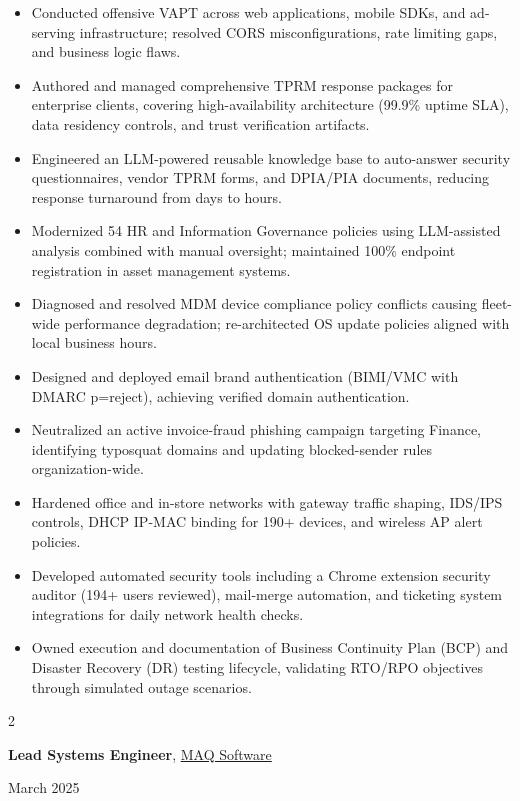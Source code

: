 \documentclass[10pt, letterpaper]{article}
\newenvironment{highlights}{
    \begin{itemize}[
        topsep=0.10 cm,
        parsep=0.10 cm,
        partopsep=0pt,
        itemsep=0pt,
        leftmargin=0 cm + 10pt
    ]
}{
    \end{itemize}
}
\newenvironment{twocolentry}[2][]{
    \onecolentry
    \def\secondColumn{#2}
    \setcolumnwidth{\fill, 4.5 cm}
    \begin{paracol}{2}
}{
    \switchcolumn \raggedleft \secondColumn
    \end{paracol}
    \endonecolentry
}
\begin{document}
\begin{highlights}
    \item Conducted offensive VAPT across web applications, mobile SDKs, and ad-serving infrastructure; resolved CORS misconfigurations, rate limiting gaps, and business logic flaws.
    \item Authored and managed comprehensive TPRM response packages for enterprise clients, covering high-availability architecture (99.9\% uptime SLA), data residency controls, and trust verification artifacts.
    \item Engineered an LLM-powered reusable knowledge base to auto-answer security questionnaires, vendor TPRM forms, and DPIA/PIA documents, reducing response turnaround from days to hours.
    \item Modernized 54 HR and Information Governance policies using LLM-assisted analysis combined with manual oversight; maintained 100\% endpoint registration in asset management systems.
    \item Diagnosed and resolved MDM device compliance policy conflicts causing fleet-wide performance degradation; re-architected OS update policies aligned with local business hours.
    \item Designed and deployed email brand authentication (BIMI/VMC with DMARC p=reject), achieving verified domain authentication.
    \item Neutralized an active invoice-fraud phishing campaign targeting Finance, identifying typosquat domains and updating blocked-sender rules organization-wide.
    \item Hardened office and in-store networks with gateway traffic shaping, IDS/IPS controls, DHCP IP-MAC binding for 190+ devices, and wireless AP alert policies.
    \item Developed automated security tools including a Chrome extension security auditor (194+ users reviewed), mail-merge automation, and ticketing system integrations for daily network health checks.
    \item Owned execution and documentation of Business Continuity Plan (BCP) and Disaster Recovery (DR) testing lifecycle, validating RTO/RPO objectives through simulated outage scenarios.
\end{highlights}

\vspace{0.2 cm}

\begin{twocolentry}{March 2025}
    \textbf{Lead Systems Engineer}, \href{https://maqsoftware.com/}{MAQ Software}
\end{twocolentry}
\end{document}
